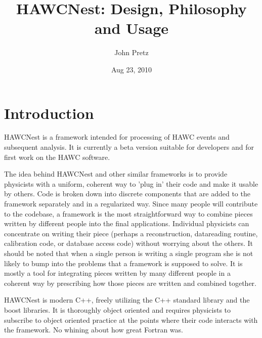 \documentclass[12pt]{article}
\title{HAWCNest: Design, Philosophy and Usage}
\author{John Pretz}
\date{Aug 23, 2010}
\begin{document}
\maketitle 


\tableofcontents

\newpage

\section{Introduction}
HAWCNest is a framework intended for processing of HAWC events and 
subsequent analysis. It is currently a beta version suitable for developers 
and for first work on the HAWC software. 

The idea behind HAWCNest and other similar frameworks is to provide physicists 
with a uniform, coherent way to 'plug in' their code and make it usable by 
others. Code is broken down into discrete components that are added to the 
framework separately and in a regularized way. Since many people will 
contribute to the codebase, a framework is the most
straightforward way to combine pieces written by different people into the 
final applications. Individual physicists can
concentrate on writing their piece (perhaps a reconstruction, datareading
routine, calibration code, or database access code)
without worrying about the others. It should be noted that when a single 
person is writing a single program she is not
likely to bump into the problems that a framework is supposed to solve. It is 
mostly a tool for integrating pieces written by
many different people in a coherent way by prescribing how those pieces are 
written and combined together.

HAWCNest is modern C++, freely utilizing the C++ standard library and the 
boost libraries. It is thoroughly object oriented
and requires physicists to subscribe to object oriented
practice at the points where their code interacts with the framework.
No whining about how great Fortran was.
\end{document}
